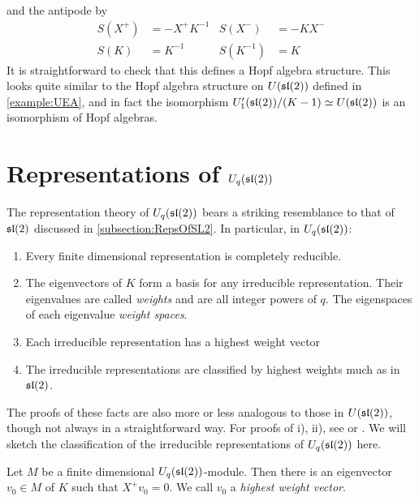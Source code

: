 and the antipode by
\begin{align}
    S(X^+) &= - X^+ K^{-1} & S(X^-)      &= -KX^- \\
    S(K) &= K^{-1}   & S(K^{-1}) &= K 
\end{align}
It is straightforward to check that this defines a Hopf algebra structure. This
looks quite similar to the Hopf algebra structure on $U(\mathfrak{sl}(2))$ defined in
\ref{example:UEA}, and in fact the isomorphism $U_1'(\mathfrak{sl}(2)) /(K-1)
\simeq U(\mathfrak{sl}(2))$ is an isomorphism of Hopf algebras.

\section{Representations of $U_q(\mathfrak{sl}(2))$}
\label{section:RepsOfUq}

The representation theory of $U_q(\mathfrak{sl}(2))$ bears a striking resemblance to
that of $\mathfrak{sl}(2)$ discussed in \ref{subsection:RepsOfSL2}. In particular, in
$U_q(\mathfrak{sl}(2))$:


\begin{enumerate}
    \renewcommand{\labelenumi}{\roman{enumi})}
    \item Every finite dimensional representation is completely reducible.
    \item The eigenvectors of $K$ form a basis for any irreducible
          representation. Their eigenvalues are called \emph{weights} and are
          all integer powers of $q$.  The eigenspaces of each eigenvalue
          \emph{weight spaces}.  
    \item Each irreducible representation has a highest weight vector
    \item The irreducible representations are classified by highest weights
    much as in $\mathfrak{sl}(2)$.
\end{enumerate}

The proofs of these facts are also more or less analogous to those in
$U(\mathfrak{sl}(2))$, though not always in a straightforward way. For proofs of i),
ii), see \cite{Kassel1994} or \cite{Jantzen1995}. We will sketch the
classification of the irreducible representations of $U_q(\mathfrak{sl}(2))$ here.

\begin{claim}
\label{claim:HighestWeight}
    Let $M$ be a finite dimensional $U_q(\mathfrak{sl}(2))$-module. Then there is an
    eigenvector $v_0 \in M$ of $K$ such that $ X^+ v_0 = 0$. We call $v_0$ a
    \emph{highest weight vector}.
\end{claim}

